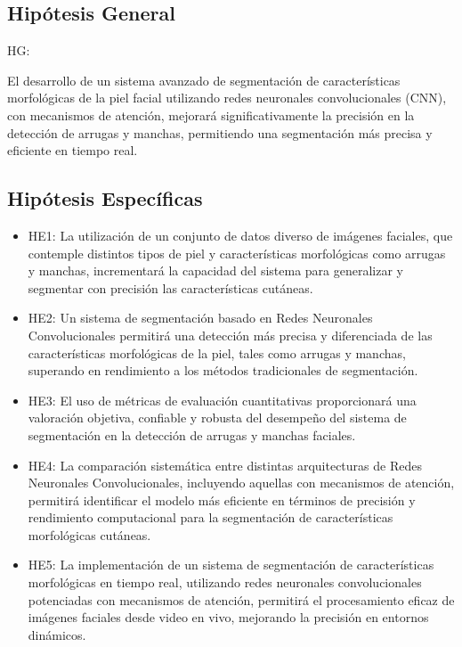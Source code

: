 \subsection{Hipótesis General}
HG: \newcommand{\HipotesisGeneral}{
	El desarrollo de un sistema avanzado de segmentación de características morfológicas de la piel facial utilizando redes neuronales convolucionales (CNN), con mecanismos de atención, mejorará significativamente la precisión en la detección de arrugas y manchas, permitiendo una segmentación más precisa y eficiente en tiempo real.}
\HipotesisGeneral


\subsection{Hipótesis Específicas}
\newcommand{\Hone}{
La utilización de un conjunto de datos diverso de imágenes faciales, que contemple distintos tipos de piel y características morfológicas como arrugas y manchas, incrementará la capacidad del sistema para generalizar y segmentar con precisión las características cutáneas.
}
\newcommand{\Htwo}{
Un sistema de segmentación basado en Redes Neuronales Convolucionales permitirá una detección más precisa y diferenciada de las características morfológicas de la piel, tales como arrugas y manchas, superando en rendimiento a los métodos tradicionales de segmentación.
}
\newcommand{\Hthree}{
El uso de métricas de evaluación cuantitativas proporcionará una valoración objetiva, confiable y robusta del desempeño del sistema de segmentación en la detección de arrugas y manchas faciales.
}
\newcommand{\Hfour}{
La comparación sistemática entre distintas arquitecturas de Redes Neuronales Convolucionales, incluyendo aquellas con mecanismos de atención, permitirá identificar el modelo más eficiente en términos de precisión y rendimiento computacional para la segmentación de características morfológicas cutáneas.
}
\newcommand{\Hfive}{
La implementación de un sistema de segmentación de características morfológicas en tiempo real, utilizando redes neuronales convolucionales potenciadas con mecanismos de atención, permitirá el procesamiento eficaz de imágenes faciales desde video en vivo, mejorando la precisión en entornos dinámicos.
}

\begin{itemize}
	\item HE1: {\Hone}
	\item HE2: {\Htwo}
	\item HE3: {\Hthree}
	\item HE4: {\Hfour}
	\item HE5: {\Hfive}
\end{itemize}